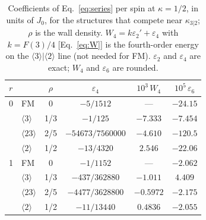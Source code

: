 \begin{table}
\caption{Coefficients of Eq.~\eqref{eq:series} per spin at $\kappa=1/2$, in units of $J_0$, for the
structures that compete near $\kappa_{3|2}$; $\rho$ is the wall density. $W_4=k\varepsilon_2'+\varepsilon_4$
with $k=F(3)/4$ [Eq.~\eqref{eq:W}] is the fourth-order energy on the $\langle3\rangle|\langle2\rangle$ line
(not needed for FM). $\varepsilon_2$ and $\varepsilon_4$ are exact; $W_4$ and $\varepsilon_6$ are rounded.}
\label{tab:eps}
\begin{ruledtabular}
\begin{tabular}{llcccc}
$r$ & & $\rho$ & $\varepsilon_4$ & $10^3\,W_4$ & $10^5\,\varepsilon_6$ \\
\hline
0 & FM                    & 0   & $-5/1512$            & ---      & $-24.15$ \\
  & $\langle3\rangle$     & 1/3 & $-1/125$             & $-7.333$ & $-7.454$ \\
  & $\langle23\rangle$    & 2/5 & $-54673/7560000$     & $-4.610$ & $-120.5$ \\
  & $\langle2\rangle$     & 1/2 & $-13/4320$           & $2.546$  & $-22.06$ \\
1 & FM                    & 0   & $-1/1152$            & ---      & $-2.062$ \\
  & $\langle3\rangle$     & 1/3 & $-437/362880$        & $-1.011$ & $4.409$  \\
  & $\langle23\rangle$    & 2/5 & $-4477/3628800$      & $-0.5972$ & $-2.175$ \\
  & $\langle2\rangle$     & 1/2 & $-11/13440$          & $0.4836$ & $-2.055$ \\
\end{tabular}
\end{ruledtabular}
\end{table}

